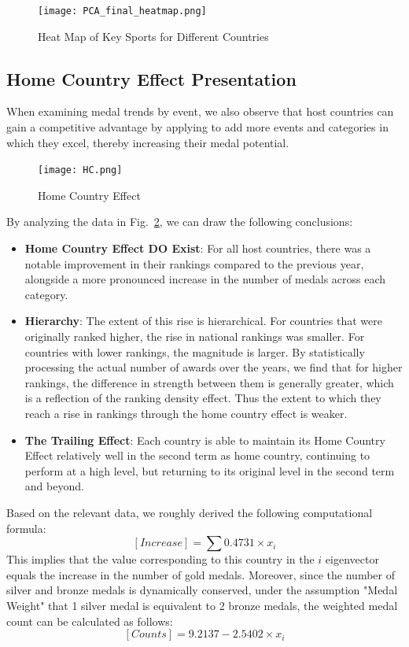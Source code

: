 \documentclass{mcmthesis}
\begin{document}
\begin{figure}[h!]
    \centering
    \texttt{[image: PCA\_final\_heatmap.png]}
    \caption{Heat Map of Key Sports for Different Countries}
    \label{fig:PCA_final_heatmap}
\end{figure}

\subsection{Home Country Effect Presentation}

When examining medal trends by event, we also observe that host countries can gain a competitive advantage by applying to add more events and categories in which they excel, thereby increasing their medal potential.

\begin{figure}[h!]
    \centering
    \texttt{[image: HC.png]}
    \caption{Home Country Effect}
    \label{fig:HC}
\end{figure}

By analyzing the data in Fig.~\ref{fig:HC}, we can draw the following conclusions:

\begin{itemize}
\item {\bf Home Country Effect DO Exist}: For all host countries, there was a notable improvement in their rankings compared to the previous year, alongside a more pronounced increase in the number of medals across each category.

\item {\bf Hierarchy}: The extent of this rise is hierarchical. For countries that were originally ranked higher, the rise in national rankings was smaller. For countries with lower rankings, the magnitude is larger. By statistically processing the actual number of awards over the years, we find that for higher rankings, the difference in strength between them is generally greater, which is a reflection of the ranking density effect. Thus the extent to which they reach a rise in rankings through the home country effect is weaker.

\item {\bf The Trailing Effect}: Each country is able to maintain its Home Country Effect relatively well in the second term as home country, continuing to perform at a high level, but returning to its original level in the second term and beyond.
\end{itemize}

Based on the relevant data, we roughly derived the following computational formula:
\[[Increase] = \sum 0.4731 \times x_i\]
This implies that the value corresponding to this country in the $i$ eigenvector equals the increase in the number of gold medals.
Moreover, since the number of silver and bronze medals is dynamically conserved, under the assumption "Medal Weight" that 1 silver medal is equivalent to 2 bronze medals, the weighted medal count can be calculated as follows:
\[[Counts] = 9.2137-2.5402 \times x_i\]
\end{document}

